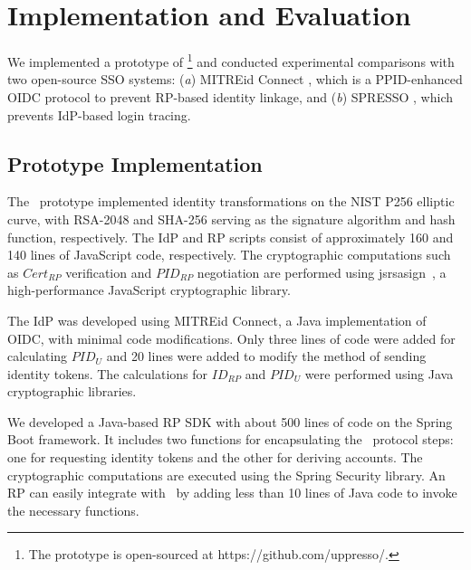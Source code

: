 \section{Implementation and Evaluation}
\label{sec:implementation}

We implemented a prototype of \usso\footnote{The prototype is open-sourced at https://github.com/uppresso/.} and conducted experimental comparisons with two open-source SSO systems: (\emph{a}) MITREid Connect \cite{MITREid}, which is a PPID-enhanced OIDC protocol to prevent RP-based identity linkage, and (\emph{b}) SPRESSO \cite{SPRESSO}, which prevents IdP-based login tracing.


\subsection{Prototype Implementation}
\label{subsec:proto-imple}

The \usso~prototype implemented identity transformations on the NIST P256 elliptic curve, with RSA-2048 and SHA-256 serving as the signature algorithm and hash function, respectively. The IdP and RP scripts consist of approximately 160 and 140 lines of JavaScript code, respectively.  %
The cryptographic computations such as $Cert_{RP}$ verification and $PID_{RP}$ negotiation are performed using jsrsasign~\cite{jsrsasign}, a high-performance JavaScript cryptographic library.

The IdP was developed using MITREid Connect\cite{MITREid}, a Java implementation of OIDC, %
with minimal code modifications. Only three lines of code were added for calculating $PID_U$ and 20 lines were added to modify the method of sending identity tokens. The calculations for $ID_{RP}$ and $PID_U$ were performed using Java cryptographic libraries. 

We developed a Java-based RP SDK with about 500 lines of code on the Spring Boot framework. It includes two functions for encapsulating the \usso~protocol steps: one for requesting identity tokens and the other for deriving accounts. The cryptographic computations are executed using the Spring Security library. An RP can easily integrate with \usso~by  adding less than 10 lines of Java code to invoke the necessary functions.
